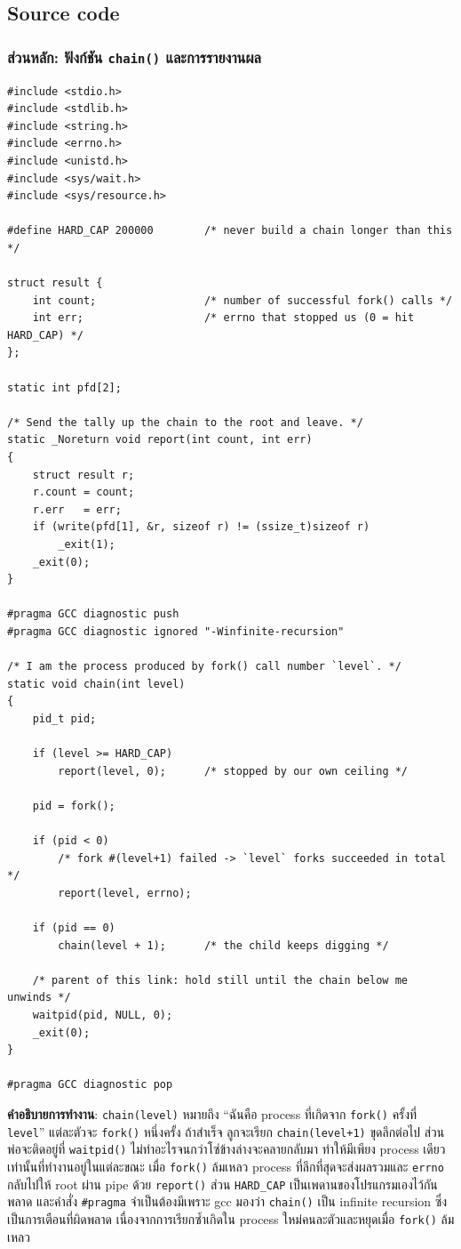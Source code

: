 \documentclass[a4paper,12pt]{article}
\newcommand{\code}[1]{\texttt{#1}}
\begin{document}
\subsection{Source code}

\subsubsection{ส่วนหลัก: ฟังก์ชัน \code{chain()} และการรายงานผล}

\begin{lstlisting}[caption={q3\_forkcount.c -- the chain and the reporting path},label={lst:q3a}]
#include <stdio.h>
#include <stdlib.h>
#include <string.h>
#include <errno.h>
#include <unistd.h>
#include <sys/wait.h>
#include <sys/resource.h>

#define HARD_CAP 200000        /* never build a chain longer than this */

struct result {
    int count;                 /* number of successful fork() calls */
    int err;                   /* errno that stopped us (0 = hit HARD_CAP) */
};

static int pfd[2];

/* Send the tally up the chain to the root and leave. */
static _Noreturn void report(int count, int err)
{
    struct result r;
    r.count = count;
    r.err   = err;
    if (write(pfd[1], &r, sizeof r) != (ssize_t)sizeof r)
        _exit(1);
    _exit(0);
}

#pragma GCC diagnostic push
#pragma GCC diagnostic ignored "-Winfinite-recursion"

/* I am the process produced by fork() call number `level`. */
static void chain(int level)
{
    pid_t pid;

    if (level >= HARD_CAP)
        report(level, 0);      /* stopped by our own ceiling */

    pid = fork();

    if (pid < 0)
        /* fork #(level+1) failed -> `level` forks succeeded in total */
        report(level, errno);

    if (pid == 0)
        chain(level + 1);      /* the child keeps digging */

    /* parent of this link: hold still until the chain below me unwinds */
    waitpid(pid, NULL, 0);
    _exit(0);
}

#pragma GCC diagnostic pop
\end{lstlisting}

\textbf{คำอธิบายการทำงาน}: \code{chain(level)} หมายถึง ``ฉันคือ process ที่เกิดจาก \code{fork()} ครั้งที่ \code{level}'' แต่ละตัวจะ \code{fork()} หนึ่งครั้ง ถ้าสำเร็จ ลูกจะเรียก \code{chain(level+1)} ขุดลึกต่อไป ส่วนพ่อจะติดอยู่ที่ \code{waitpid()} ไม่ทำอะไรจนกว่าโซ่ข้างล่างจะคลายกลับมา ทำให้มีเพียง process เดียวเท่านั้นที่ทำงานอยู่ในแต่ละขณะ เมื่อ \code{fork()} ล้มเหลว process ที่ลึกที่สุดจะส่งผลรวมและ \code{errno} กลับไปให้ root ผ่าน pipe ด้วย \code{report()} ส่วน \code{HARD\_CAP} เป็นเพดานของโปรแกรมเองไว้กันพลาด และคำสั่ง \code{\#pragma} จำเป็นต้องมีเพราะ gcc มองว่า \code{chain()} เป็น infinite recursion ซึ่งเป็นการเตือนที่ผิดพลาด เนื่องจากการเรียกซ้ำเกิดใน process ใหม่คนละตัวและหยุดเมื่อ \code{fork()} ล้มเหลว
\end{document}
